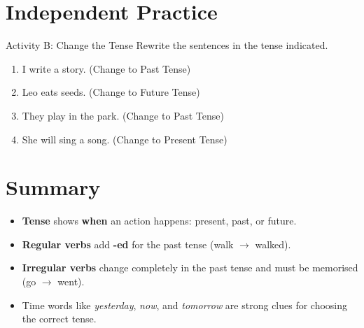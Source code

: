 \section{Independent Practice}
\begin{activitybox}{Activity B: Change the Tense}
Rewrite the sentences in the tense indicated.
\begin{enumerate}
    \item I write a story. (Change to Past Tense)
    \item Leo eats seeds. (Change to Future Tense)
    \item They play in the park. (Change to Past Tense)
    \item She will sing a song. (Change to Present Tense)
\end{enumerate}
\end{activitybox}

\section{Summary}
\begin{summarybox}
    \begin{itemize}
        \item \textbf{Tense} shows \textbf{when} an action happens: present, past, or future.
        \item \textbf{Regular verbs} add \textbf{-ed} for the past tense (walk \(\rightarrow\) walked).
        \item \textbf{Irregular verbs} change completely in the past tense and must be memorised (go \(\rightarrow\) went).
        \item Time words like \textit{yesterday}, \textit{now}, and \textit{tomorrow} are strong clues for choosing the correct tense.
    \end{itemize}
\end{summarybox}